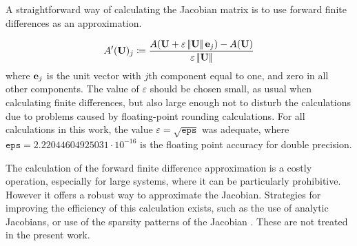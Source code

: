 A straightforward way of calculating the Jacobian matrix is to use forward finite differences as an approximation.

\begin{equation}
	A'(\textbf{U})_j \coloneqq \frac{A(\textbf{U}+\varepsilon\left|\!\left| {\textbf{U}} \right|\!\right|\textbf{e}_j )-A(\textbf{U})  }{\varepsilon\left|\!\left| {\textbf{U}} \right|\!\right|}
\end{equation}
where $\textbf{e}_j$ is the unit vector with $j$th component equal to one, and zero in all other components. The value of $\varepsilon$ should be chosen small, as usual when calculating finite differences, but also large enough not to disturb the calculations due to problems caused by floating-point rounding calculations.  For all calculations in this work, the value $\varepsilon = \sqrt{\mathtt{eps}}$ was adequate, where $\mathtt{eps} = 2.22044604925031 \cdot 10^{-16}$ is the floating point accuracy for double precision.

The calculation of the forward finite difference approximation is a costly operation, especially for large systems, where it can be particularly prohibitive. However it offers a robust way to approximate the Jacobian. Strategies for improving the efficiency of this calculation exists, such as the use of analytic Jacobians, or use of the sparsity patterns of the Jacobian \parencite{kelleyIterativeMethodsLinear1995}. These are not treated in the present work. 
